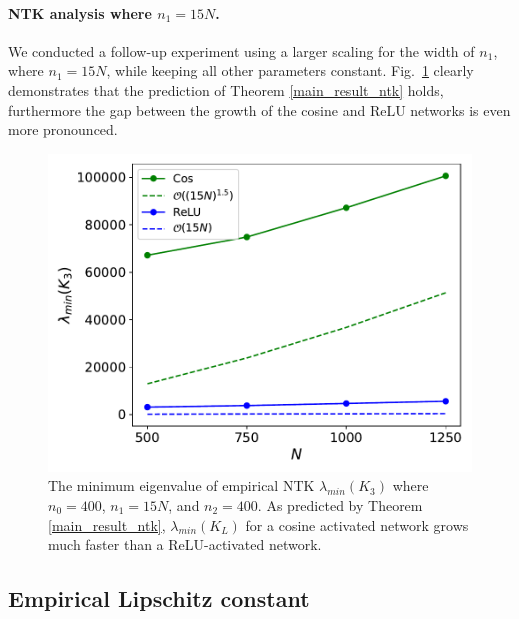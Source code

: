 \documentclass{article}
\theoremstyle{plain}
\theoremstyle{definition}
\theoremstyle{remark}
\begin{document}
\paragraph{NTK analysis where $n_1=15N$.} We conducted a follow-up experiment using a larger scaling for the width of $n_1$, where $n_1 = 15N$, while keeping all other parameters constant. Fig.~\ref{fig:ntk2} clearly demonstrates that the prediction of Theorem \ref{main_result_ntk} holds, furthermore the gap between the growth of the cosine and ReLU networks is even more pronounced.


\begin{figure}[t]
\includegraphics[width=1.0\linewidth]{experiments/ICML_mineigval_fixn2_15N.pdf}
\hspace{-0.4cm}
\caption{The minimum eigenvalue of empirical NTK $\lambda_{min}(K_3)$ where $n_0=400$, $n_{1} = 15N$, 
 and $n_2 = 400$. As predicted by Theorem \ref{main_result_ntk}, $\lambda_{min}(K_L)$ for a cosine activated network grows much faster than a ReLU-activated network.}\label{fig:ntk2}
\end{figure}

\subsection{Empirical Lipschitz constant}\label{subsec:exps_lipschitz}

\end{document}
